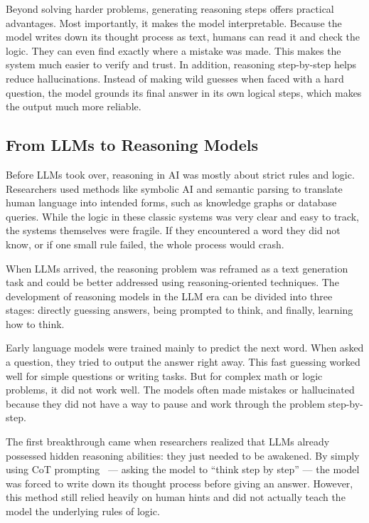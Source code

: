Beyond solving harder problems, generating reasoning steps offers practical advantages. Most importantly, it makes the model interpretable. Because the model writes down its thought process as text, humans can read it and check the logic. They can even find exactly where a mistake was made. This makes the system much easier to verify and trust. In addition, reasoning step-by-step helps reduce hallucinations. Instead of making wild guesses when faced with a hard question, the model grounds its final answer in its own logical steps, which makes the output much more reliable.

\subsection{From LLMs to Reasoning Models}

Before LLMs took over, reasoning in AI was mostly about strict rules and logic. Researchers used methods like symbolic AI and semantic parsing to translate human language into intended forms, such as knowledge graphs or database queries. While the logic in these classic systems was very clear and easy to track, the systems themselves were fragile. If they encountered a word they did not know, or if one small rule failed, the whole process would crash.

When LLMs arrived, the reasoning problem was reframed as a text generation task and could be better addressed using reasoning-oriented techniques. The development of reasoning models in the LLM era can be divided into three stages: directly guessing answers, being prompted to think, and finally, learning how to think.

Early language models were trained mainly to predict the next word. When asked a question, they tried to output the answer right away. This fast guessing worked well for simple questions or writing tasks. But for complex math or logic problems, it did not work well. The models often made mistakes or hallucinated because they did not have a way to pause and work through the problem step-by-step.

The first breakthrough came when researchers realized that LLMs already possessed hidden reasoning abilities: they just needed to be awakened. By simply using CoT prompting~\cite{wei-etal:2022chain} --- asking the model to ``think step by step'' --- the model was forced to write down its thought process before giving an answer. However, this method still relied heavily on human hints and did not actually teach the model the underlying rules of logic.

